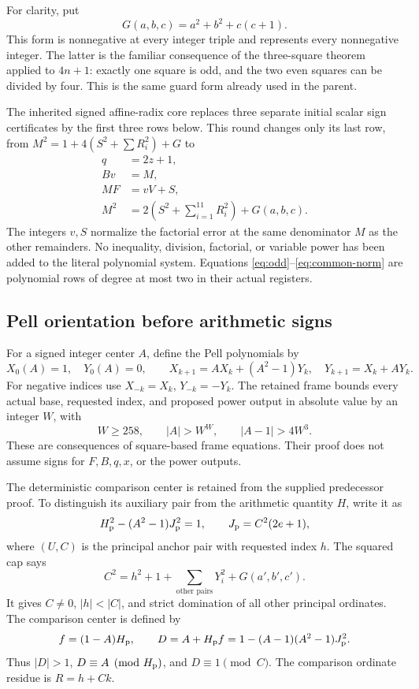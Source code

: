 For clarity, put
\[
 G(a,b,c)=a^2+b^2+c(c+1).
\]
This form is nonnegative at every integer triple and represents every
nonnegative integer. The latter is the familiar consequence of the
three-square theorem applied to \(4n+1\): exactly one square is odd, and
the two even squares can be divided by four. This is the same guard form
already used in the parent.

The inherited signed affine-radix core replaces three separate initial
scalar sign certificates by the first three rows below. This round
changes only its last row, from $M^2=1+4(S^2+\sum R_i^2)+G$ to
\begin{align}
 q&=2z+1,                                                    \label{eq:odd}\\
 Bv&=M,                                                     \label{eq:factor-ratio}\\
 MF&=vV+S,                                                  \label{eq:factor-error}\\
 M^2&=2\left(S^2+\sum_{i=1}^{11}R_i^2\right)+G(a,b,c).
                                                               \label{eq:common-norm}
\end{align}
The integers \(v,S\) normalize the factorial error at the same
denominator \(M\) as the other remainders. No inequality, division,
factorial, or variable power has been added to the literal polynomial
system. Equations \eqref{eq:odd}--\eqref{eq:common-norm} are polynomial
rows of degree at most two in their actual registers.

\subsection{Pell orientation before arithmetic signs}

For a signed integer center \(A\), define the Pell polynomials by
\[
 X_0(A)=1,\quad Y_0(A)=0,\qquad
 X_{k+1}=AX_k+(A^2-1)Y_k,\quad Y_{k+1}=X_k+AY_k.
\]
For negative indices use \(X_{-k}=X_k\), \(Y_{-k}=-Y_k\).
The retained frame bounds every actual base, requested index, and proposed
power output in absolute value by an integer \(W\), with
\begin{equation}\label{eq:frame}
 W\ge258,\qquad |A|>W^W,\qquad |A-1|>4W^3.
\end{equation}
These are consequences of square-based frame equations. Their proof does
not assume signs for \(F,B,q,x\), or the power outputs.

The deterministic comparison center is retained from the supplied
predecessor proof. To distinguish its auxiliary pair
from the arithmetic quantity \(H\), write it as
\[
 H_{\rm p}^2-(A^2-1)J_{\rm p}^2=1,\qquad
 J_{\rm p}=C^2(2e+1),
\]
where \((U,C)\) is the principal anchor pair with requested index \(h\).
The squared cap says
\[
 C^2=h^2+1+\sum_{\text{other pairs}}Y_i^2+G(a',b',c').
\]
It gives \(C\ne0\), \(|h|<|C|\), and strict domination of all other
principal ordinates. The comparison center is defined by
\[
 f=(1-A)H_{\rm p},\qquad D=A+H_{\rm p}f
    =1-(A-1)(A^2-1)J_{\rm p}^2.
\]
Thus \(|D|>1\), \(D\equiv A\pmod{H_{\rm p}}\), and \(D\equiv1\pmod C\).
The comparison ordinate residue is \(R=h+Ck\).

